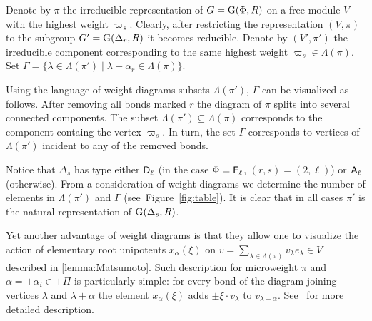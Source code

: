 Denote by $\pi$ the irreducible representation of $G=\operatorname{G}(\Phi, R)$ on a free module $V$ with the highest weight $\varpi_s$.
Clearly, after restricting the representation $(V, \pi)$ to the subgroup $G'=\operatorname{G}(\Delta_r, R)$ it becomes reducible.
Denote by $(V', \pi')$ the irreducible component corresponding to the same highest weight $\varpi_s \in \Lambda(\pi)$.
Set $\Gamma = \{\lambda \in \Lambda(\pi') \mid \lambda - \alpha_r \in \Lambda(\pi) \}.$ 

Using the language of weight diagrams subsets $\Lambda(\pi')$, $\Gamma$ can be visualized as follows.
After removing all bonds marked $r$ the diagram of $\pi$ splits into several connected components.
The subset $\Lambda(\pi') \subseteq \Lambda(\pi)$ corresponds to the component containg the vertex $\varpi_s$.
In turn, the set $\Gamma$ corresponds to vertices of $\Lambda(\pi')$ incident to any of the removed bonds.

Notice that $\Delta_s$ has type either $\mathsf{D}_\ell$ (in the case $\Phi=\mathsf{E}_\ell$, $(r,s)=(2,\ell)$) or $\mathsf{A}_\ell$ (otherwise).
From a consideration of weight diagrams we determine the number of elements in $\Lambda(\pi')$ and $\Gamma$ (see~Figure~\ref{fig:table}).
It is clear that in all cases $\pi'$ is the natural representation of $\operatorname{G}(\Delta_s, R)$.

Yet another advantage of weight diagrams is that they allow one to visualize the action of elementary root unipotents $x_\alpha(\xi)$ on $v = \sum_{\lambda \in \Lambda(\pi)} v_\lambda e_\lambda \in V$ described in \cref{lemma:Matsumoto}.
Such description for microweight $\pi$ and $\alpha = \pm\alpha_i\in \pm\Pi$ is particularly simple: 
for every bond of the diagram joining vertices $\lambda$ and $\lambda + \alpha$ the element $x_{\alpha}(\xi)$ adds $\pm \xi \cdot v_\lambda$ to $v_{\lambda+\alpha}$.
See~\cite[Section~3.4]{PSV98} for more detailed description.

